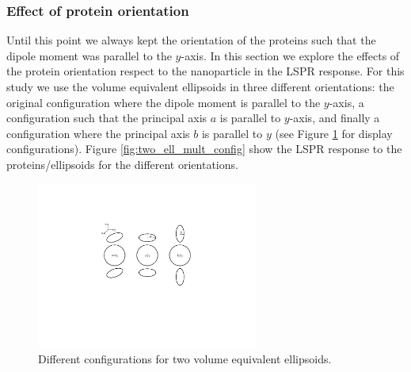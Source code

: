  \subsubsection{Effect of protein orientation}

 Until this point we always kept the orientation of the proteins such that the dipole moment was parallel to the $y$-axis. In this 
 section we explore the effects of the protein orientation respect to the nanoparticle in the LSPR response. For this study we use the 
 volume equivalent ellipsoids in three different orientations: the original configuration where the dipole moment is parallel to 
 the $y$-axis, a configuration such that the principal axis $a$ is parallel to $y$-axis, 
 and finally a configuration where the principal axis $b$ is parallel to $y$ (see Figure \ref{fig:two_ve_conf_display} for display configurations). Figure \ref{fig:two_ell_mult_config}
 show the LSPR response to the proteins/ellipsoids for the different orientations. 
 
 \begin{figure} %
    \centering
    \includegraphics[width=0.65\textwidth]{viz/two_ve_conf_display.pdf} 
    \caption{Different configurations for two volume equivalent ellipsoids.}
    \label{fig:two_ve_conf_display}
 \end{figure}
 
